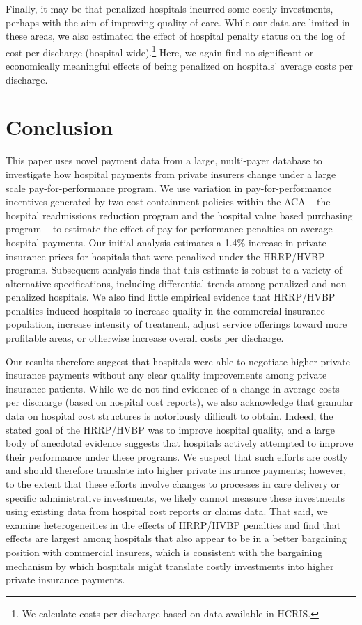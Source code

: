 \documentclass[12pt]{article}
\begin{document}
Finally, it may be that penalized hospitals incurred some costly investments, perhaps with the aim of improving quality of care. While our data are limited in these areas, we also estimated the effect of hospital penalty status on the log of cost per discharge (hospital-wide).\footnote{We calculate costs per discharge based on data available in HCRIS.} Here, we again find no significant or economically meaningful effects of being penalized on hospitals' average costs per discharge.

\section{Conclusion}
\label{sec:Conclusion}
This paper uses novel payment data from a large, multi-payer database to investigate how hospital payments from private insurers change under a large scale pay-for-performance program. We use variation in pay-for-performance incentives generated by two cost-containment policies within the ACA -- the hospital readmissions reduction program and the hospital value based purchasing program -- to estimate the effect of pay-for-performance penalties on average hospital payments. Our initial analysis estimates a 1.4\% increase in private insurance prices for hospitals that were penalized under the HRRP/HVBP programs. Subsequent analysis finds that this estimate is robust to a variety of alternative specifications, including differential trends among penalized and non-penalized hospitals. We also find little empirical evidence that HRRP/HVBP penalties induced hospitals to increase quality in the commercial insurance population, increase intensity of treatment, adjust service offerings toward more profitable areas, or otherwise increase overall costs per discharge.

Our results therefore suggest that hospitals were able to negotiate higher private insurance payments without any clear quality improvements among private insurance patients. While we do not find evidence of a change in average costs per discharge (based on hospital cost reports), we also acknowledge that granular data on hospital cost structures is notoriously difficult to obtain. Indeed, the stated goal of the HRRP/HVBP was to improve hospital quality, and a large body of anecdotal evidence suggests that hospitals actively attempted to improve their performance under these programs. We suspect that such efforts are costly and should therefore translate into higher private insurance payments; however, to the extent that these efforts involve changes to processes in care delivery or specific administrative investments, we likely cannot measure these investments using existing data from hospital cost reports or claims data. That said, we examine heterogeneities in the effects of HRRP/HVBP penalties and find that effects are largest among hospitals that also appear to be in a better bargaining position with commercial insurers, which is consistent with the bargaining mechanism by which hospitals might translate costly investments into higher private insurance payments.
\end{document}
